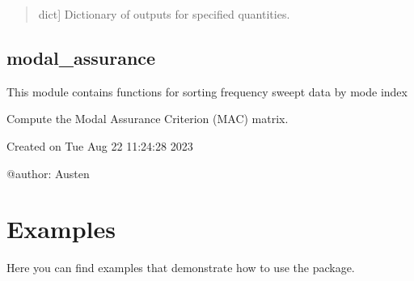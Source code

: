 \documentclass[letterpaper,10pt,english]{sphinxmanual}
\begin{document}
\begin{fulllineitems}
\begin{quote}
\begin{description}
\begin{description}
\end{description}

\begin{description}
\sphinxlineitem{\sphinxstylestrong{output}}{[}dict{]}
\sphinxAtStartPar
Dictionary of outputs for specified quantities.

\end{description}

\end{description}\end{quote}

\end{fulllineitems}

\label{\detokenize{utils:module-pywfe.utils.modal_assurance}}

\subsection{modal\_assurance}
\label{\detokenize{utils:modal-assurance}}
\sphinxAtStartPar
This module contains functions for sorting frequency sweept data by mode index

\begin{fulllineitems}
\label{\detokenize{utils:pywfe.utils.modal_assurance.mac_matrix}}
\pysigstartsignatures
{}
\pysigstopsignatures
\sphinxAtStartPar
Compute the Modal Assurance Criterion (MAC) matrix.

\end{fulllineitems}

\label{\detokenize{utils:module-pywfe.utils.shaker}}
\sphinxAtStartPar
Created on Tue Aug 22 11:24:28 2023

\sphinxAtStartPar
@author: Austen

\sphinxstepscope


\section{Examples}
\label{\detokenize{examples/index:examples}}\label{\detokenize{examples/index:examples-index}}\label{\detokenize{examples/index::doc}}
\sphinxAtStartPar
Here you can find examples that demonstrate how to use the  package.
\end{document}
